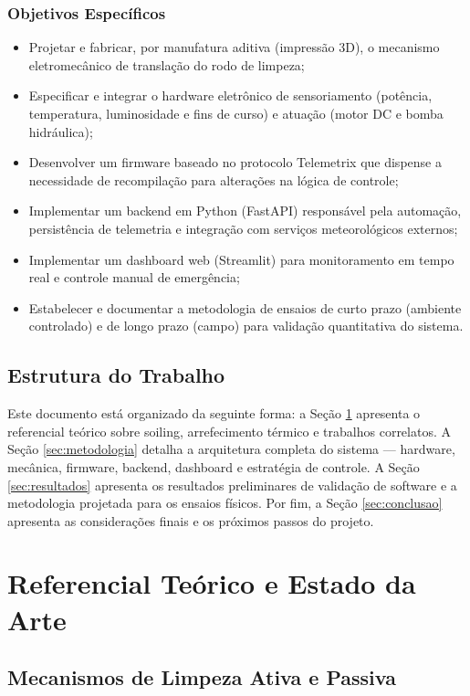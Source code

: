 \documentclass[12pt, a4paper]{article}
\begin{document}
\subsubsection{Objetivos Específicos}
\begin{itemize}
    \item Projetar e fabricar, por manufatura aditiva (impressão 3D), o mecanismo eletromecânico de translação do rodo de limpeza;
    \item Especificar e integrar o hardware eletrônico de sensoriamento (potência, temperatura, luminosidade e fins de curso) e atuação (motor DC e bomba hidráulica);
    \item Desenvolver um firmware baseado no protocolo Telemetrix que dispense a necessidade de recompilação para alterações na lógica de controle;
    \item Implementar um backend em Python (FastAPI) responsável pela automação, persistência de telemetria e integração com serviços meteorológicos externos;
    \item Implementar um dashboard web (Streamlit) para monitoramento em tempo real e controle manual de emergência;
    \item Estabelecer e documentar a metodologia de ensaios de curto prazo (ambiente controlado) e de longo prazo (campo) para validação quantitativa do sistema.
\end{itemize}

\subsection{Estrutura do Trabalho}

Este documento está organizado da seguinte forma: a Seção \ref{sec:referencial} apresenta o referencial teórico sobre soiling, arrefecimento térmico e trabalhos correlatos. A Seção \ref{sec:metodologia} detalha a arquitetura completa do sistema — hardware, mecânica, firmware, backend, dashboard e estratégia de controle. A Seção \ref{sec:resultados} apresenta os resultados preliminares de validação de software e a metodologia projetada para os ensaios físicos. Por fim, a Seção \ref{sec:conclusao} apresenta as considerações finais e os próximos passos do projeto.

\section{Referencial Teórico e Estado da Arte}
\label{sec:referencial}

\subsection{Mecanismos de Limpeza Ativa e Passiva}
\end{document}
